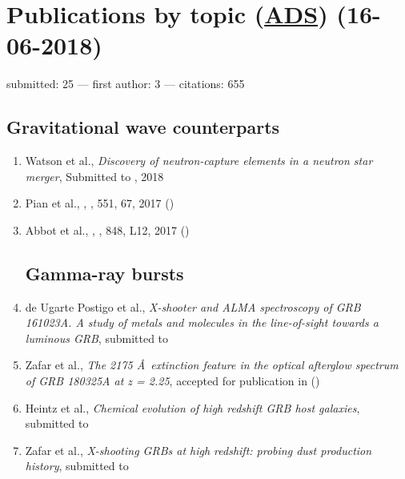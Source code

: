 \documentclass[12pt,letterpaper]{article}
\begin{document}
\newpage

\section*{Publications  by topic (\href{\adsurl}{ADS}) (16-06-2018)}
    submitted: 25 ---
    first author: 3 ---
    citations: 655


    \vspace{1em}

	\subsection*{\textbf{Gravitational wave counterparts}}
	\begin{enumerate}

\item Watson et al.,
	{\it Discovery of neutron-capture elements in a neutron star merger},
Submitted to \nature, 2018

\item Pian et al.,
	,
	\nature, 551, 67, 2017 ()

\item Abbot et al.,
	,
	\apjl, 848, L12, 2017 ()

\subsection*{Gamma-ray bursts}


\item de Ugarte Postigo et al.,
{\it X-shooter and ALMA spectroscopy of GRB 161023A.
	A study of metals and molecules in the line-of-sight towards a luminous GRB},
submitted to \aanda

\item Zafar et al.,
{\it The 2175 \AA~extinction feature in the optical afterglow spectrum of GRB 180325A at z = 2.25},
accepted for publication in \apjl ()

\item Heintz et al.,
	{\it Chemical evolution of high redshift GRB host galaxies},
	submitted to \aanda

\item Zafar et al.,
	{\it X-shooting GRBs at high redshift: probing dust production history},
	submitted to \mnras


\end{enumerate}
\end{document}
